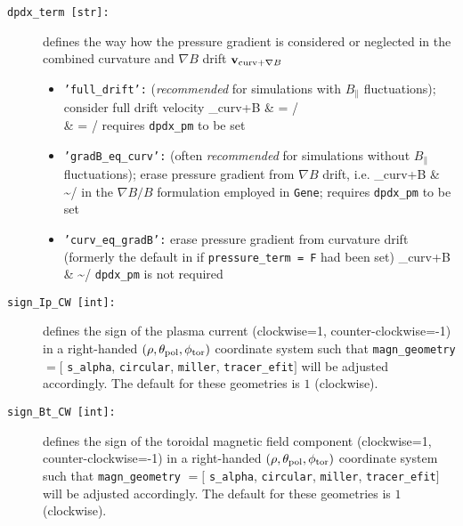 \documentclass[12pt]{article}
\begin{document}
\begin{description}
\item[\hypertarget{dpdx_term}{\tt dpdx\_term [str]:}] defines the way how the pressure gradient is considered or neglected in the
combined curvature and $\nabla B$ drift $\mathbf{v}_{{\rm curv}+\nabla B}$
\begin{itemize}
 \item {\tt 'full\_drift':} ({\em recommended} for simulations with $B_\|$ fluctuations); consider full drift velocity
 \bea
 _{{\rm curv}+\nabla B} & = \times{}/\Omega \nn \\
 & = \times{}/\Omega \nn
 \eea
 requires {\tt dpdx\_pm} to be set
 \item {\tt 'gradB\_eq\_curv':} (often {\em recommended} for simulations without $B_\|$ fluctuations); erase pressure gradient from $\nabla B$ drift, i.e.
 \bea
 _{{\rm curv}+\nabla B} & \sim {}\times{}/\Omega \nn
 \eea
 in the $\nabla B/B$ formulation employed in {\tt Gene}; requires {\tt dpdx\_pm} to be set
 \item {\tt 'curv\_eq\_gradB':} erase pressure gradient from curvature drift (formerly the default in \gene if {\tt pressure\_term = F} had been set)
 \bea
 _{{\rm curv}+\nabla B} & \sim {}\times{}/\Omega \nn
 \eea
 {\tt dpdx\_pm} is not required
\end{itemize}
\item[\hypertarget{sign_Ip_CW}{\tt sign\_Ip\_CW [int]:}] defines the sign of the plasma current (clockwise=1, counter-clockwise=-1) in a right-handed $(\rho,\theta_{\rm pol},\phi_{\rm tor})$ coordinate system such that {\tt magn\_geometry} $=[$ {\tt s\_alpha}, {\tt circular}, {\tt miller}, {\tt tracer\_efit}$]$ will be adjusted accordingly. The default for these geometries is $1$ (clockwise).
\item[\hypertarget{sign_Bt_CW}{\tt sign\_Bt\_CW [int]:}] defines the sign of the toroidal magnetic field component (clockwise=1, counter-clockwise=-1) in a right-handed $(\rho,\theta_{\rm pol},\phi_{\rm tor})$ coordinate system such that {\tt magn\_geometry} $=[$ {\tt s\_alpha}, {\tt circular}, {\tt miller}, {\tt tracer\_efit}$]$ will be adjusted accordingly. The default for these geometries is $1$ (clockwise).


\end{description}
\end{document}
